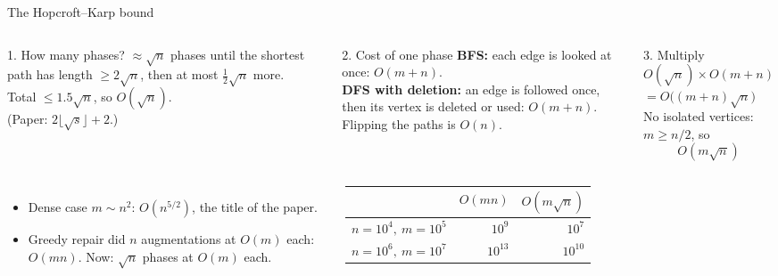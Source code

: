 \documentclass[aspectratio=169,11pt]{beamer}
\begin{document}
\begin{frame}{The Hopcroft--Karp bound}
\begin{columns}[T]
\begin{block}{1. How many phases?}
\footnotesize
$\approx\sqrt n$ phases until the shortest path has length $\ge 2\sqrt n$, then at most $\tfrac12\sqrt n$ more.\\[1mm]
Total $\le 1.5\sqrt n$, so $O(\sqrt n)$.\\
{\scriptsize (Paper: $2\lfloor\sqrt s\rfloor+2$.)}
\end{block}
\begin{block}{2. Cost of one phase}
\footnotesize
\textbf{BFS:} each edge is looked at once: $O(m+n)$.\\
\textbf{DFS with deletion:} an edge is followed once, then its vertex is deleted or used: $O(m+n)$.\\
Flipping the paths is $O(n)$.
\end{block}
\begin{block}{3. Multiply}
\footnotesize
$O(\sqrt n)\times O(m+n)$\\[1mm]
$=O\big((m+n)\sqrt n\big)$\\[1mm]
No isolated vertices: $m\ge n/2$, so
\[\boxed{O(m\sqrt n)}\]
\end{block}
\end{columns}
\vspace{1mm}
\begin{columns}[T]
\small
\begin{itemize}\setlength\itemsep{4pt}
  \item Dense case $m\sim n^2$: $O(n^{5/2})$, the title of the paper.
  \item Greedy repair did $n$ augmentations at $O(m)$ each: $O(mn)$. Now: $\sqrt n$ phases at $O(m)$ each.
\end{itemize}
\begin{tabular}{lrr}
\toprule
 & $O(mn)$ & $O(m\sqrt n)$\\
\midrule
$n=10^4,\ m=10^5$ & $10^9$ & $10^7$\\
$n=10^6,\ m=10^7$ & $10^{13}$ & $10^{10}$\\
\bottomrule
\end{tabular}
\end{columns}
\end{frame}
\end{document}

